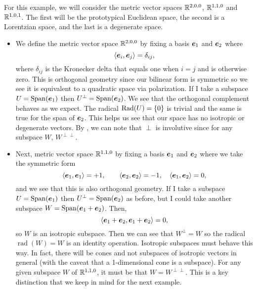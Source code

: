 \begin{example}
For this example, we will consider the metric vector spaces $\mathbb{R}^{2,0,0}$, $\mathbb{R}^{1,1,0}$ and $\mathbb{R}^{1,0,1}$. The first will be the prototypical Euclidean space, the second is a Lorentzian space, and the last is a degenerate space.
\begin{itemize}
    \item We define the metric vector space $\mathbb{R}^{2,0,0}$ by fixing a basis $\boldsymbol{e}_1$ and $\boldsymbol{e}_2$ where
    \begin{equation}
        \langle \boldsymbol{e}_i, \boldsymbol{e}_j \rangle = \delta_{ij},
    \end{equation}
    where $\delta_{ij}$ is the Kronecker delta that equals one when $i=j$ and is otherwise zero. This is orthogonal geometry since our bilinear form is symmetric so we see it is equivalent to a quadratic space via polarization. If I take a subspace $U=\operatorname{Span} (\boldsymbol{e}_1)$ then $U^\perp = \operatorname{Span}(\boldsymbol{e}_2)$. We see that the orthogonal complement behaves as we expect. The radical $\operatorname{Rad}(U)=\{0\}$ is trivial and the same is true for the span of $\boldsymbol{e}_2$. This helps us see that our space has no isotropic or degenerate vectors. By  , we can note that $\perp$ is involutive since for any subspace $W$, $W^{\perp \perp}$.

    \item Next, metric vector space $\mathbb{R}^{1,1,0}$ by fixing a basis $\boldsymbol{e}_1$ and $\boldsymbol{e}_2$ where we take the symmetric form
    \begin{equation}
        \langle \boldsymbol{e}_1, \boldsymbol{e}_1 \rangle = +1, \qquad \langle \boldsymbol{e}_2, \boldsymbol{e}_2 \rangle = -1, \quad \langle \boldsymbol{e}_1,\boldsymbol{e}_2 \rangle = 0,
    \end{equation}
    and we see that this is also orthogonal geometry. If I take a subspace $U=\operatorname{Span} (\boldsymbol{e}_1)$ then $U^\perp = \operatorname{Span}(\boldsymbol{e}_2)$ as before, but I could take another subspace $W=\operatorname{Span}(\boldsymbol{e}_1+\boldsymbol{e}_2)$. Then, 
\begin{equation}
    \langle \boldsymbol{e}_1 + \boldsymbol{e}_2 , \boldsymbol{e}_1 + \boldsymbol{e}_2 \rangle = 0,
\end{equation}
    so $W$ is an isotropic subspace. Then we can see that $W^\perp = W$ so the radical $\operatorname{rad}(W)=W$ is an identity operation. Isotropic subspaces must behave this way. In fact, there will be cones and not subspaces of isotropic vectors in general (with the caveat that a 1-dimensional cone is a subspace). For any given subspace $W$ of $\mathbb{R}^{1,1,0}$, it must be that $W=W^{\perp \perp}$. This is a key distinction that we keep in mind for the next example.


\end{itemize}
\end{example}
